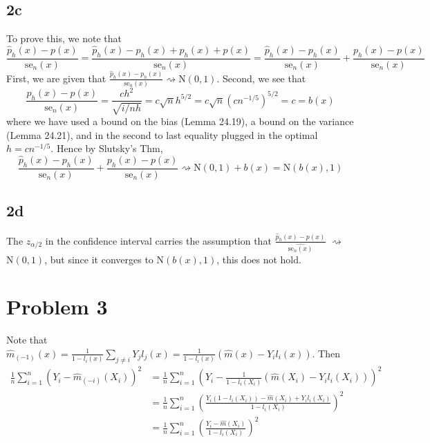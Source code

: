 \documentclass[12pt]{article}
\begin{document}
\subsection*{2c}
To prove this, we note that
\begin{equation}
    \frac{\hat{p}_h(x) - p(x)}{\text{se}_n(x)}
        = \frac{\hat{p}_h(x) - p_h(x) + p_h(x) + p(x)}{\text{se}_n(x)}
        = \frac{\hat{p}_h(x) - p_h(x)}{\text{se}_n(x)} + \frac{p_h(x) - p(x)}{\text{se}_n(x)}
\end{equation}
First, we are given that $\frac{\hat{p}_h(x) - p_h(x)}{\text{se}_n(x)} \rightsquigarrow \text{N}(0,1)$. Second, we see that
\begin{equation}
    \frac{p_h(x) - p(x)}{\text{se}_n(x)} = \frac{ch^2}{\sqrt{i/nh}} = c\sqrt{n}h^{5/2} = c\sqrt{n}\left(cn^{-1/5}\right)^{5/2} = c = b(x)
\end{equation}
where we have used a bound on the bias (Lemma 24.19), a bound on the variance (Lemma 24.21), and in the second to last 
equality plugged in the optimal $h = cn^{-1/5}$. Hence by Slutsky's Thm, 
\begin{equation}
    \frac{\hat{p}_h(x) - p_h(x)}{\text{se}_n(x)} + \frac{p_h(x) - p(x)}{\text{se}_n(x)}
    \rightsquigarrow \text{N}(0,1) + b(x) = \text{N}(b(x),1)
\end{equation}

\subsection*{2d}
The $z_{\alpha/2}$ in the confidence interval carries the assumption that 
$\frac{\hat{p}_h(x) - p(x)}{\hat{\text{se}_n(x)}}$ $\rightsquigarrow$ $\text{N}(0,1)$, 
but since it converges to $\text{N}(b(x),1)$, this does not hold.

\section*{Problem 3}
\label{sec:prob3}
Note that $\hat{m}_{(-1)}(x) = \frac{1}{1 - l_i(x)} \sum_{j \neq i}Y_j l_j(x) = \frac{1}{1 - l_i(x)}\left( \hat{m}(x) - Y_i l_i(x) \right)$.
Then
\begin{equation}
    \begin{split}
        \frac{1}{n}\sum_{i=1}^n \left( Y_i - \hat{m}_{(-i)}(X_i) \right)^2 
        &= \frac{1}{n}\sum_{i=1}^n 
            \left(Y_i - \frac{1}{1 - l_i(X_i)}\left( \hat{m}(X_i) - Y_i l_i(X_i) \right) \right)^2 \\
        &= \frac{1}{n}\sum_{i=1}^n \left( \frac{Y_i(1 - l_i(X_i))  - \hat{m}(X_i) + Y_i l_i(X_i)}{1-l_i(X_i)}  \right)^2 \\
        &= \frac{1}{n}\sum_{i=1}^n \left( \frac{Y_i  - \hat{m}(X_i)}{1-l_i(X_i)}  \right)^2
    \end{split}
\end{equation}
\end{document}
